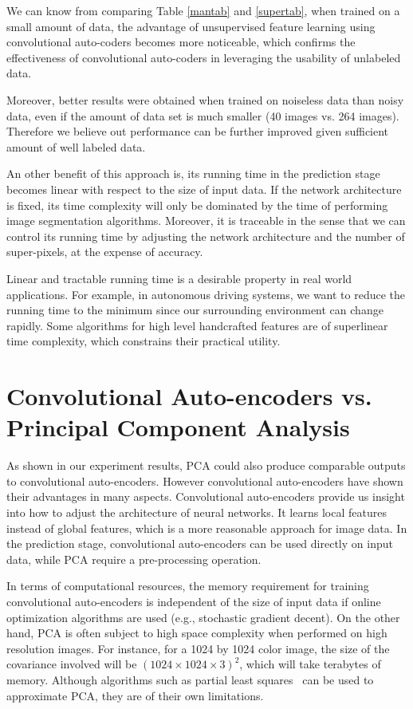 We can know from comparing Table \ref{mantab} and \ref{supertab}, when trained on a small amount of data, the advantage of unsupervised feature learning using convolutional auto-coders becomes more noticeable, which confirms the effectiveness of convolutional auto-coders in leveraging the usability of unlabeled data. 

Moreover, better results were obtained when trained on noiseless data than noisy data, even if the amount of data set is much smaller (40 images vs. 264 images). Therefore we believe out performance can be further improved given sufficient amount of well labeled data.

An other benefit of this approach is, its running time in the prediction stage becomes linear with respect to the size of input data. If the network architecture is fixed, its time complexity will only be dominated by the time of performing image segmentation algorithms. Moreover, it is traceable in the sense that we can control its running time by adjusting the network architecture and the number of super-pixels, at the expense of accuracy. 

Linear and tractable running time is a desirable property in real world applications. For example, in autonomous driving systems, we want to reduce the running time to the minimum since our surrounding environment can change rapidly. Some algorithms for high level handcrafted features are of superlinear time complexity, which constrains their practical utility.

\section{Convolutional Auto-encoders vs. Principal Component Analysis}
As shown in our experiment results, PCA could also produce comparable outputs to convolutional auto-encoders. However convolutional auto-encoders have shown their advantages in many aspects. Convolutional auto-encoders provide us insight into how to adjust the architecture of neural networks. It learns local features instead of global features, which is a more reasonable approach for image data. In the prediction stage, convolutional auto-encoders can be used directly on input data, while PCA require a pre-processing operation.

In terms of computational resources, the memory requirement for training convolutional auto-encoders is independent of the size of input data if online optimization algorithms are used (e.g., stochastic gradient decent). On the other hand, PCA is often subject to high space complexity when performed on high resolution images. For instance, for a 1024 by 1024 color image, the size of the covariance involved will be $(1024\times1024\times3)^2$, which will take terabytes of memory. Although algorithms such as partial least squares~\cite{geladi1986partial} can be used to approximate PCA, they are of their own limitations.

